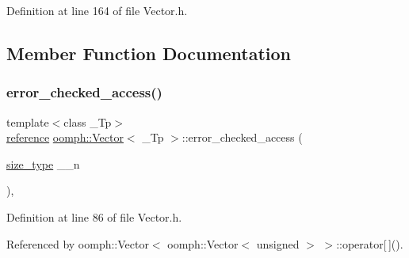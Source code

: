 Definition at line 164 of file Vector.\+h.



\subsection{Member Function Documentation}
\mbox{\label{classoomph_1_1Vector_ac0b7cb9144acb726a6e1955532607883}} 
\subsubsection{\texorpdfstring{error\+\_\+checked\+\_\+access()}{error\_checked\_access()}\hspace{0.1cm}{\footnotesize\ttfamily [1/2]}}
{\footnotesize\ttfamily template$<$class \+\_\+\+Tp$>$ \\
\hyperlink{classoomph_1_1Vector_a7bd8c89b884168f3ecc358acc501d356}{reference} \hyperlink{classoomph_1_1Vector}{oomph\+::\+Vector}$<$ \+\_\+\+Tp $>$\+::error\+\_\+checked\+\_\+access (\begin{DoxyParamCaption}\item[{\hyperlink{classoomph_1_1Vector_a8ad2a43bd51f6bf2a981dd4e4e4247f5}{size\+\_\+type}}]{\+\_\+\+\_\+n }\end{DoxyParamCaption})\hspace{0.3cm}{\ttfamily [inline]}, {\ttfamily [private]}}



Definition at line 86 of file Vector.\+h.



Referenced by oomph\+::\+Vector$<$ oomph\+::\+Vector$<$ unsigned $>$ $>$\+::operator\mbox{[}$\,$\mbox{]}().

\mbox{\label{classoomph_1_1Vector_a8c17ec5380c2056eacc506490fe386e9}} 
